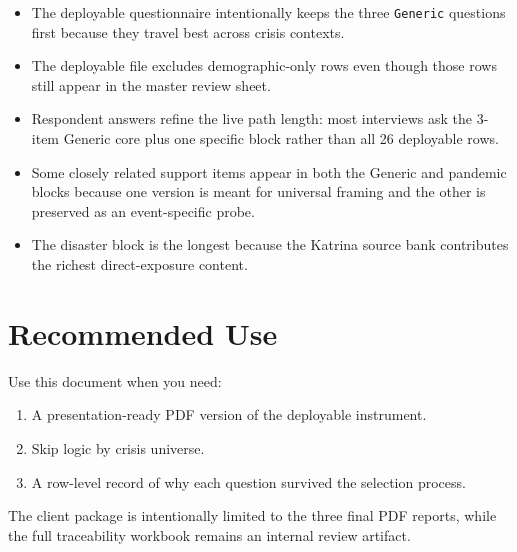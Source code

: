 \documentclass[12pt]{article}
\begin{document}
\begin{itemize}
\item The deployable questionnaire intentionally keeps the three \texttt{Generic} questions first because they travel best across crisis contexts.
\item The deployable file excludes demographic-only rows even though those rows still appear in the master review sheet.
\item Respondent answers refine the live path length: most interviews ask the 3-item Generic core plus one specific block rather than all 26 deployable rows.
\item Some closely related support items appear in both the Generic and pandemic blocks because one version is meant for universal framing and the other is preserved as an event-specific probe.
\item The disaster block is the longest because the Katrina source bank contributes the richest direct-exposure content.
\end{itemize}

\section{Recommended Use}

Use this document when you need:

\begin{enumerate}
\item A presentation-ready PDF version of the deployable instrument.
\item Skip logic by crisis universe.
\item A row-level record of why each question survived the selection process.
\end{enumerate}

The client package is intentionally limited to the three final PDF reports, while the full traceability workbook remains an internal review artifact.
\end{document}

